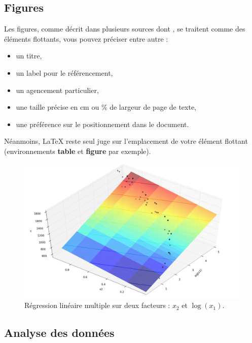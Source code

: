 \documentclass[12pt]{article} %
\begin{document}
\subsection{Figures}

Les figures, comme décrit dans plusieurs sources dont \cite{codeco_endemic_2001}, se traitent comme des éléments flottants, vous pouvez préciser entre autre :
\begin{itemize}
	\item un titre,
	\item un label pour le référencement,
	\item un agencement particulier,
	\item une taille précise en cm ou \% de largeur de page de texte,
	\item une préférence sur le positionnement dans le document.
\end{itemize}

Néanmoins, \LaTeX{} reste seul juge sur l'emplacement de votre élément flottant (environnements \textbf{table} et \textbf{figure} par exemple).

\begin{figure}[ht] %
	\centering
	\includegraphics[width=\textwidth]{image.png}
	\caption{Régression linéaire multiple sur deux facteurs : $x_2$ et $\log(x_1)$.}
	\label{fig:image}
\end{figure}

\subsection{Analyse des données}
\end{document}
